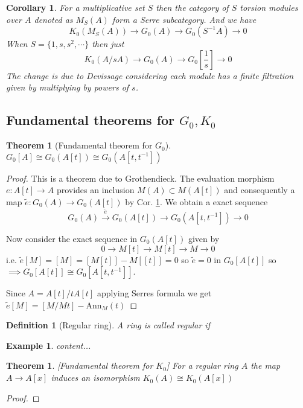 \documentclass[12pt]{article}
\numberwithin{equation}{section}
\newcounter{dummy} \numberwithin{dummy}{section}
\newtheorem{theorem}[dummy]{Theorem}
\newtheorem{definition}[dummy]{Definition}
\newtheorem{corollary}[dummy]{Corollary}
\newtheorem{example}[dummy]{Example}
\begin{document}
	\begin{corollary}\label{localizationk0corrolary}
		For a multiplicative set $S$ then the category of $S$ torsion modules over $A$ denoted as $M_S(A)$ form a Serre subcategory. And we have \[ K_0(M_S(A) ) \to G_0(A) \to G_0(S^{-1}A) \to 0 \]
		When $S=\{1,s,s^2,\cdots \}$ then just \[ K_0(A/sA) \to G_0(A) \to G_0[\frac{1}{s}]	 \to 0\]
		The change is due to Devissage considering each module has a finite filtration given by multiplying by powers of $s$.
	\end{corollary}
	\subsection{Fundamental theorems for $G_0, K_0$}
	\begin{theorem}[Fundamental theorem for $G_0$]
		$G_0[A] \cong G_0(A[t]) \cong G_0(A[t,t^{-1}])$
	\end{theorem}

	\begin{proof}
		This is a theorem due to Grothendieck.
		The evaluation morphism $e: A[t] \to A$ provides an inclusion $M(A) \subset M(A[t])$ and consequently a map $\tilde{e}: G_0(A) \to G_0(A[t])$ by Cor. \ref{localizationk0corrolary}. We obtain a exact sequence \[ G_0(A) \xrightarrow{\tilde{e}} G_0(A[t]) \to G_0(A[t,t^{-1}]) \to 0 \]
		
		Now consider the exact sequence in $G_0(A[t])$ given by \[ 0 \to M[t]\to M[t] \to M \to 0 \] i.e. $\tilde e [M]=[M]=[M[t]]-M[[t]]=0$ so $\tilde e =0$ in $G_0[A[t]]$ so $ \implies G_0[A[t]] \cong G_0[A[t,t^{-1	}]]$.
		
		Since $A=A[t]/tA[t]$ applying Serres formula we get $\tilde e [M]=[M/Mt]- \mathrm{Ann}_M(t)$
	\end{proof}
	
	
	\begin{definition}[Regular ring] A ring is called regular if
	\end{definition}
	\begin{example}
		content...
	\end{example}
	\begin{theorem}\label{extensionk0iscong}[Fundamental theorem for $K_0$]
		For a regular ring $A$ the map $A \to A[x]$ induces an isomorphism $K_0(A) \cong K_0(A[x])$ 
	\end{theorem}
	\begin{proof}
	
	\end{proof}
	
\end{document}
